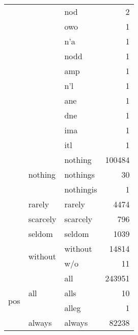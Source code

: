\begin{longtable}[ht]{lllr}
 &  & nod & {\cellcolor[HTML]{FFFFD9}} \color[HTML]{000000} 2 \\
 &  & owo & {\cellcolor[HTML]{FFFFD9}} \color[HTML]{000000} 1 \\
 &  & n'a & {\cellcolor[HTML]{FFFFD9}} \color[HTML]{000000} 1 \\
 &  & nodd & {\cellcolor[HTML]{FFFFD9}} \color[HTML]{000000} 1 \\
 &  & amp & {\cellcolor[HTML]{FFFFD9}} \color[HTML]{000000} 1 \\
 &  & n'l & {\cellcolor[HTML]{FFFFD9}} \color[HTML]{000000} 1 \\
 &  & ane & {\cellcolor[HTML]{FFFFD9}} \color[HTML]{000000} 1 \\
 &  & dne & {\cellcolor[HTML]{FFFFD9}} \color[HTML]{000000} 1 \\
 &  & ima & {\cellcolor[HTML]{FFFFD9}} \color[HTML]{000000} 1 \\
 &  & itl & {\cellcolor[HTML]{FFFFD9}} \color[HTML]{000000} 1 \\
\cline{2-4}
 & \multirow[c]{3}{*}{nothing} & nothing & {\cellcolor[HTML]{F8FCCA}} \color[HTML]{000000} 100484 \\
 &  & nothings & {\cellcolor[HTML]{FFFFD9}} \color[HTML]{000000} 30 \\
 &  & nothingis & {\cellcolor[HTML]{FFFFD9}} \color[HTML]{000000} 1 \\
\cline{2-4}
 & rarely & rarely & {\cellcolor[HTML]{FFFFD9}} \color[HTML]{000000} 4474 \\
\cline{2-4}
 & scarcely & scarcely & {\cellcolor[HTML]{FFFFD9}} \color[HTML]{000000} 796 \\
\cline{2-4}
 & seldom & seldom & {\cellcolor[HTML]{FFFFD9}} \color[HTML]{000000} 1039 \\
\cline{2-4}
 & \multirow[c]{2}{*}{without} & without & {\cellcolor[HTML]{FEFFD8}} \color[HTML]{000000} 14814 \\
 &  & w/o & {\cellcolor[HTML]{FFFFD9}} \color[HTML]{000000} 11 \\
\cline{1-4} \cline{2-4}
\multirow[c]{35}{*}{pos} & \multirow[c]{3}{*}{all} & all & {\cellcolor[HTML]{EDF8B2}} \color[HTML]{000000} 243951 \\
 &  & alls & {\cellcolor[HTML]{FFFFD9}} \color[HTML]{000000} 10 \\
 &  & alleg & {\cellcolor[HTML]{FFFFD9}} \color[HTML]{000000} 1 \\
\cline{2-4}
 & always & always & {\cellcolor[HTML]{F9FDCC}} \color[HTML]{000000} 82238 \\
\cline{2-4}

\end{longtable}
